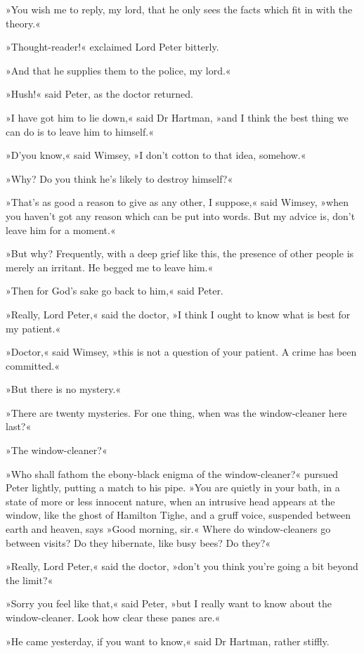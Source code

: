 »You wish me to reply, my lord, that he only sees the facts which fit in with the theory.«

»Thought-reader!« exclaimed Lord Peter bitterly.

»And that he supplies them to the police, my lord.«

»Hush!« said Peter, as the doctor returned.

»I have got him to lie down,« said Dr Hartman, »and I think the best thing we can do is to leave him to himself.«

»D'you know,« said Wimsey, »I don't cotton to that idea, somehow.«

»Why? Do you think he's likely to destroy himself?«

»That's as good a reason to give as any other, I suppose,« said Wimsey, »when you haven't got any reason which can be put into words. But my advice is, don't leave him for a moment.«

»But why? Frequently, with a deep grief like this, the presence of other people is merely an irritant. He begged me to leave him.«

»Then for God's sake go back to him,« said Peter.

»Really, Lord Peter,« said the doctor, »I think I ought to know what is best for my patient.«

»Doctor,« said Wimsey, »this is not a question of your patient. A crime has been committed.«

»But there is no mystery.«

»There are twenty mysteries. For one thing, when was the window-cleaner here last?«

»The window-cleaner?«

»Who shall fathom the ebony-black enigma of the window-cleaner?« pursued Peter lightly, putting a match to his pipe. »You are quietly in your bath, in a state of more or less innocent nature, when an intrusive head appears at the window, like the ghost of Hamilton Tighe, and a gruff voice, suspended between earth and heaven, says »Good morning, sir.« Where do window-cleaners go between visits? Do they hibernate, like busy bees? Do they\longdash?«

»Really, Lord Peter,« said the doctor, »don't you think you're going a bit beyond the limit?«

»Sorry you feel like that,« said Peter, »but I really want to know about the window-cleaner. Look how clear these panes are.«

»He came yesterday, if you want to know,« said Dr Hartman, rather stiffly.

